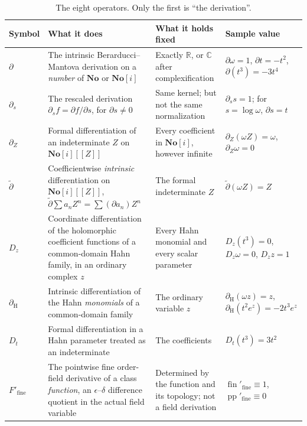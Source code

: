 \documentclass[11pt,letterpaper]{article}
\numberwithin{equation}{section}
\theoremstyle{definition}
\theoremstyle{remark}
\newcommand{\No}{\mathbf{No}}
\newcommand{\SC}{\mathbf{No}[i]}
\newcommand{\R}{\mathbb R}
\newcommand{\C}{\mathbb C}
\newcommand{\der}{\partial}
\newcommand{\pp}{\operatorname{pp}}
\newcommand{\fin}{\operatorname{fin}}
\newcommand{\dercoef}{\der_{\mathrm H}}
\newcommand{\dertil}{\widetilde{\der}}
\newcommand{\derZ}{\der_{Z}}
\newcommand{\Dz}{D_{z}}
\begin{document}
\begin{table}[htbp]
\centering\small
\caption{The eight operators. Only the first is ``the derivation''.}
\label{diff:tab:derivatives}
\begin{tabularx}{\textwidth}{@{}L{0.14\textwidth}YL{0.20\textwidth}L{0.19\textwidth}@{}}
\toprule
Symbol & What it does & What it holds fixed & Sample value \\
\midrule
$\der$ &
The intrinsic Berarducci--Mantova derivation on a \emph{number} of $\No$ or
$\SC$ &
Exactly $\R$, or $\C$ after complexification &
$\der\omega=1$, $\der t=-t^{2}$, $\der(t^{3})=-3t^{4}$ \\[0.35em]
$\der_{s}$ &
The rescaled derivation $\der_{s}f=\der f/\der s$, for $\der s\neq0$ &
Same kernel; but not the same normalization &
$\der_{s}s=1$; for $s=\log\omega$, $\der s=t$ \\[0.35em]
$\derZ$ &
Formal differentiation of an indeterminate $Z$ on $\SC[[Z]]$ &
Every coefficient in $\SC$, however infinite &
$\derZ(\omega Z)=\omega$, $\derZ\omega=0$ \\[0.35em]
$\dertil$ &
Coefficientwise \emph{intrinsic} differentiation on $\SC[[Z]]$,
$\dertil\sum a_{n}Z^{n}=\sum(\der a_{n})Z^{n}$ &
The formal indeterminate $Z$ &
$\dertil(\omega Z)=Z$ \\[0.35em]
$\Dz$ &
Coordinate differentiation of the holomorphic coefficient functions of a
common-domain Hahn family, in an ordinary complex $z$ &
Every Hahn monomial and every scalar parameter &
$\Dz(t^{3})=0$, $\Dz\omega=0$, $\Dz z=1$ \\[0.35em]
$\dercoef$ &
Intrinsic differentiation of the Hahn \emph{monomials} of a common-domain
family &
The ordinary variable $z$ &
$\dercoef(\omega z)=z$, $\dercoef(t^{2}e^{z})=-2t^{3}e^{z}$ \\[0.35em]
$D_{t}$ &
Formal differentiation in a Hahn parameter treated as an indeterminate &
The coefficients &
$D_{t}(t^{3})=3t^{2}$ \\[0.35em]
$F'_{\mathrm{fine}}$ &
The pointwise fine order-field derivative of a class \emph{function}, an
$\epsilon$--$\delta$ difference quotient in the actual field variable &
Determined by the function and its topology; not a field derivation &
$\fin'_{\mathrm{fine}}\equiv1$, $\pp'_{\mathrm{fine}}\equiv0$ \\
\bottomrule
\end{tabularx}
\end{table}
\end{document}
